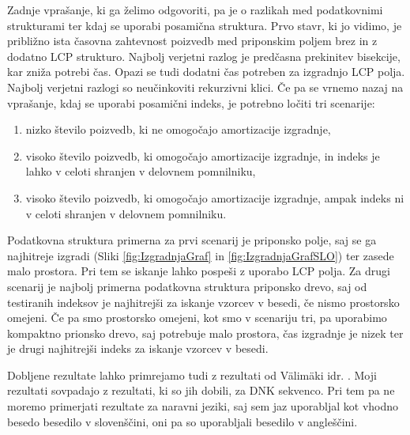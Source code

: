 Zadnje vprašanje, ki ga želimo odgovoriti, pa je o razlikah med podatkovnimi strukturami ter kdaj se uporabi posamična struktura. Prvo stavr, ki jo vidimo, je približno ista časovna zahtevnost poizvedb med priponskim poljem brez in z dodatno LCP strukturo. Najbolj verjetni razlog je predčasna prekinitev bisekcije, kar zniža potrebi čas. Opazi se tudi dodatni čas potreben za izgradnjo LCP polja. Najbolj verjetni razlogi so neučinkoviti rekurzivni klici. Če pa se vrnemo nazaj na vprašanje, kdaj se uporabi posamični indeks, je potrebno ločiti tri scenarije: 
\begin{enumerate}
        \item nizko število poizvedb, ki ne omogočajo amortizacije izgradnje,
        \item visoko število poizvedb, ki omogočajo amortizacije izgradnje, in indeks je lahko v celoti shranjen v delovnem pomnilniku,
        \item visoko število poizvedb, ki omogočajo amortizacije izgradnje, ampak indeks ni v celoti shranjen v delovnem pomnilniku.
\end{enumerate} 
Podatkovna struktura primerna za prvi scenarij je priponsko polje, saj se ga najhitreje izgradi (Sliki \ref{fig:IzgradnjaGraf} in \ref{fig:IzgradnjaGrafSLO}) ter zasede malo prostora. Pri tem se iskanje lahko pospeši z uporabo LCP polja. Za drugi scenarij je najbolj primerna podatkovna struktura priponsko drevo, saj od testiranih indeksov je najhitrejši za iskanje vzorcev v besedi, če nismo prostorsko omejeni. Če pa smo prostorsko omejeni, kot smo v scenariju tri, pa uporabimo kompaktno prionsko drevo, saj potrebuje malo prostora, čas izgradnje je nizek ter je drugi najhitrejši indeks za iskanje vzorcev v besedi.

Dobljene rezultate lahko primrejamo tudi z rezultati od Välimäki idr. \cite{Valimaki2007}. Moji rezultati sovpadajo z rezultati, ki so jih dobili, za DNK sekvenco. Pri tem pa ne moremo primerjati rezultate za naravni jeziki, saj sem jaz uporabljal kot vhodno besedo besedilo v slovenščini, oni pa so uporabljali besedilo v angleščini.
